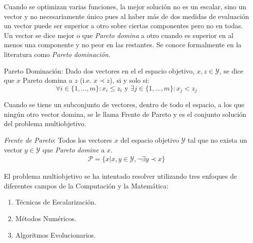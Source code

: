 Cuando se optimizan varias funciones, la mejor soluci\'on  no es un escalar, sino un vector y no necesariamente \'unico pues al haber m\'as de dos medidas de evaluaci\'on un vector puede ser superior a otro sobre ciertas componentes pero no en todas. Un vector se dice mejor o que \textit{Pareto domina} a otro cuando es superior en al menos una componente y no peor en las restantes. Se conoce formalmente en la literatura como \textit{Pareto dominaci\'on}.
\begin{definition}{Pareto Dominaci\'on:}
    \label{background:def:domintation}
    Dado dos vectores en el el espacio objetivo, $x, z \in \mathcal{Y}$, se dice que $x$ Pareto domina a $z$ (i.e. $x \prec z$), si y solo si:
    \begin{equation*}
        \forall i \in \{1, ..., m\}: x_i \leq z_i \text{ y } \exists j \in \{1, ..., m\}: x_j < z_j
    \end{equation*}
\end{definition}

Cuando se tiene un subconjunto de vectores, dentro de todo el espacio,  a los que ning\'un otro vector domina, se le  llama Frente de Pareto y es el conjunto soluci\'on del problema multiobjetivo.

\begin{definition}
    \label{background:def:pareto_front}
    \textit{Frente de Pareto}: Todos los vectores $x$ del espacio objetivo $\mathcal{Y}$ tal que no exista un vector $y \in \mathcal{Y}$ que \textit{Pareto domine} a $x$.
    \begin{align*}
        \mathcal{P} = \{x| x, y \in \mathcal{Y}, \neg \exists y \prec x \} 
    \end{align*}
\end{definition}



El problema multiobjetivo se ha intentado resolver utilizando tres enfoques de diferentes campos de la Computaci\'on y la Matem\'atica:
\begin{enumerate}
    \item T\'ecnicas de Escalarizaci\'on.
    \item M\'etodos Num\'ericos.
    \item Algoritmos Evolucionarios.
\end{enumerate}



